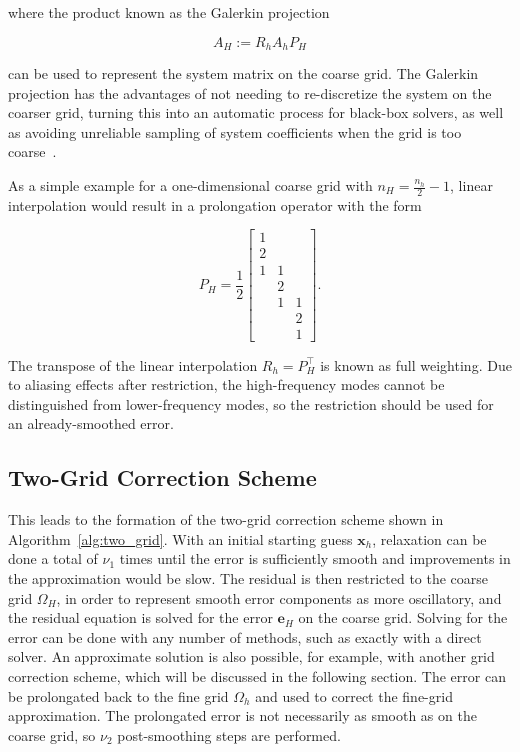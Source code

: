 where the product known as the Galerkin projection

\begin{equation}
	\label{eq:Galerkin}
	A_H := R_h A_h P_H
\end{equation}

can be used to represent the system matrix on the coarse grid. The Galerkin projection has the advantages of not needing to re-discretize the system on the coarser grid, turning this into an automatic process for black-box solvers, as well as avoiding unreliable sampling of system coefficients when the grid is too coarse~\cite{Wesseling2004}.

As a simple example for a one-dimensional coarse grid with $n_H = \frac{n_h}{2} - 1$, linear interpolation would result in a prolongation operator with the form

\begin{equation}
	P_H = \frac{1}{2}\begin{bmatrix}
		1 &   &   \\
		2 &   &   \\
		1 & 1 &   \\
		  & 2 &   \\
		  & 1 & 1 \\
		  &   & 2 \\
		  &   & 1
	\end{bmatrix}.
\end{equation}

The transpose of the linear interpolation $R_h = P_H^\top$ is known as full weighting. Due to aliasing effects after restriction, the high-frequency modes cannot be distinguished from lower-frequency modes, so the restriction should be used for an already-smoothed error.

\subsection{Two-Grid Correction Scheme}

This leads to the formation of the two-grid correction scheme shown in Algorithm~\ref{alg:two_grid}. With an initial starting guess $\mathbf{x}_h$, relaxation can be done a total of $\nu_1$ times until the error is sufficiently smooth and improvements in the approximation would be slow. The residual is then restricted to the coarse grid $\Omega_H$, in order to represent smooth error components as more oscillatory, and the residual equation is solved for the error $\mathbf{e}_H$ on the coarse grid. Solving for the error can be done with any number of methods, such as exactly with a direct solver. An approximate solution is also possible, for example, with another grid correction scheme, which will be discussed in the following section. The error can be prolongated back to the fine grid $\Omega_h$ and used to correct the fine-grid approximation. The prolongated error is not necessarily as smooth as on the coarse grid, so $\nu_2$ post-smoothing steps are performed.

